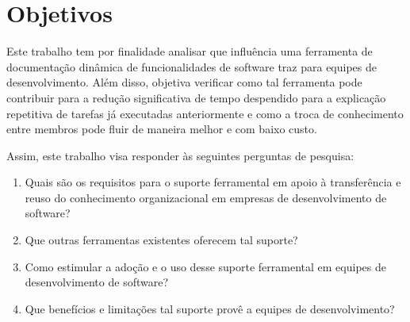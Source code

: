 \chapter{Objetivos}

Este trabalho tem por finalidade analisar que influência uma ferramenta de documentação dinâmica de funcionalidades de software traz para equipes de desenvolvimento. Além disso, objetiva verificar como tal ferramenta pode contribuir para a redução significativa de tempo despendido para a explicação repetitiva de tarefas já executadas anteriormente e como a troca de conhecimento entre membros pode fluir de maneira melhor e com baixo custo.





Assim, este trabalho visa responder às seguintes perguntas de pesquisa:

\begin{enumerate}
\item Quais são os requisitos para o suporte ferramental em apoio à transferência e reuso do conhecimento organizacional em empresas de desenvolvimento de software?
\item Que outras ferramentas existentes oferecem tal suporte?
\item Como estimular a adoção e o uso desse suporte ferramental em equipes de desenvolvimento de software? 
\item Que benefícios e limitações tal suporte provê a equipes de desenvolvimento?

\end{enumerate}

